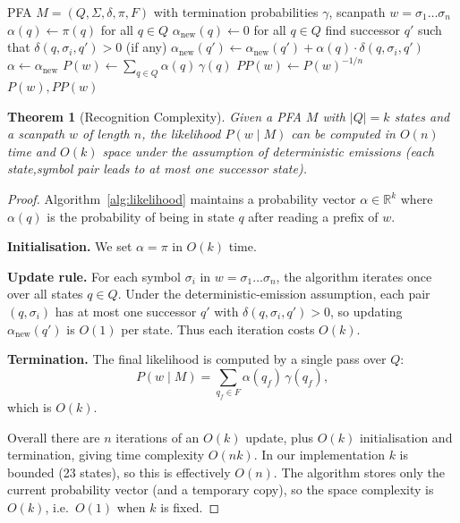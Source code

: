 \documentclass[sigconf]{acmart}
\theoremstyle{plain}
\newtheorem{theorem}{Theorem}
\theoremstyle{definition}
\begin{document}
\begin{algorithm}[t]
  \caption{Scanpath likelihood and perplexity under a PFA}
  \label{alg:likelihood}
  \begin{algorithmic}[1]
    \Require PFA $M = (Q,\Sigma,\delta,\pi,F)$ with termination probabilities $\gamma$, scanpath $w = \sigma_1 \dots \sigma_n$
    \State $\alpha(q) \gets \pi(q)$ for all $q \in Q$ 
      \State $\alpha_{\text{new}}(q) \gets 0$ for all $q \in Q$
        \State find successor $q'$ such that $\delta(q,\sigma_i,q') > 0$ (if any)
          \State $\alpha_{\text{new}}(q') \gets \alpha_{\text{new}}(q') + \alpha(q) \cdot \delta(q,\sigma_i,q')$
        \EndIf
      \EndFor
      \State $\alpha \gets \alpha_{\text{new}}$
    \EndFor
    \State $P(w) \gets \sum_{q \in Q} \alpha(q)\,\gamma(q)$
    \State $PP(w) \gets P(w)^{-1/n}$ 
    \State \Return $P(w), PP(w)$
  \end{algorithmic}
\end{algorithm}

\begin{theorem}[Recognition Complexity]
\label{thm:complexity}
Given a PFA $M$ with $|Q| = k$ states and a scanpath $w$ of length $n$, the likelihood $P(w \mid M)$ can be computed in $O(n)$ time and $O(k)$ space under the assumption of deterministic emissions (each state,symbol pair leads to at most one successor state).
\end{theorem}

\begin{proof}
Algorithm~\ref{alg:likelihood} maintains a probability vector $\alpha \in \mathbb{R}^k$ where $\alpha(q)$ is the probability of being in state $q$ after reading a prefix of $w$.

\textbf{Initialisation.}
We set $\alpha = \pi$ in $O(k)$ time.

\textbf{Update rule.}
For each symbol $\sigma_i$ in $w = \sigma_1\ldots\sigma_n$, the algorithm iterates once over all states $q \in Q$.
Under the deterministic-emission assumption, each pair $(q,\sigma_i)$ has at most one successor $q'$ with $\delta(q,\sigma_i,q') > 0$, so updating $\alpha_{\text{new}}(q')$ is $O(1)$ per state.
Thus each iteration costs $O(k)$.

\textbf{Termination.}
The final likelihood is computed by a single pass over $Q$:
\[
P(w \mid M) = \sum_{q_f \in F} \alpha(q_f)\,\gamma(q_f),
\]
which is $O(k)$.

Overall there are $n$ iterations of an $O(k)$ update, plus $O(k)$ initialisation and termination, giving time complexity $O(nk)$.
In our implementation $k$ is bounded (23 states), so this is effectively $O(n)$.
The algorithm stores only the current probability vector (and a temporary copy), so the space complexity is $O(k)$, i.e.\ $O(1)$ when $k$ is fixed.
\end{proof}
\end{document}
